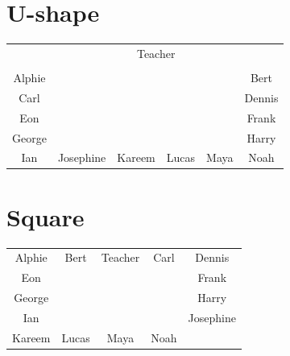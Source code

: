 \documentclass[landscape,a5paper]{article}
\begin{document}
\section{U-shape}
\begin{table}[ht]
\centering
\begin{tabular}{cccccc}
\cline{3-4} &  & \multicolumn{2}{|c|}{Teacher} &  & \\\cline{3-4}\\\cline{1-1} \cline{6-6}
\multicolumn{1}{|c|}{Alphie} &  &  &  &  & \multicolumn{1}{|c|}{Bert}\\\cline{1-1} \cline{6-6}\cline{1-1} \cline{6-6}
\multicolumn{1}{|c|}{Carl} &  &  &  &  & \multicolumn{1}{|c|}{Dennis}\\\cline{1-1} \cline{6-6}\cline{1-1} \cline{6-6}
\multicolumn{1}{|c|}{Eon} &  &  &  &  & \multicolumn{1}{|c|}{Frank}\\\cline{1-1} \cline{6-6}\cline{1-1} \cline{6-6}
\multicolumn{1}{|c|}{George} &  &  &  &  & \multicolumn{1}{|c|}{Harry}\\\cline{1-1} \cline{6-6}\cline{1-6}
\multicolumn{1}{|c|}{Ian} & \multicolumn{1}{|c|}{Josephine} & \multicolumn{1}{|c|}{Kareem} & \multicolumn{1}{|c|}{Lucas} & \multicolumn{1}{|c|}{Maya} & \multicolumn{1}{|c|}{Noah}\\\cline{1-6}
\end{tabular}
\end{table}

\clearpage
\section{Square}
\begin{table}[ht]
\centering
\begin{tabular}{ccccc}
\cline{1-5}
\multicolumn{1}{|c|}{Alphie} & \multicolumn{1}{|c|}{Bert} & \multicolumn{1}{|c|}{\cellcolor{gray} {\color{white}Teacher}} & \multicolumn{1}{|c|}{Carl} & \multicolumn{1}{|c|}{Dennis}\\\cline{1-5}\cline{1-1} \cline{5-5}
\multicolumn{1}{|c|}{Eon} &  &  &  & \multicolumn{1}{|c|}{Frank}\\\cline{1-1} \cline{5-5}\cline{1-1} \cline{5-5}
\multicolumn{1}{|c|}{George} &  &  &  & \multicolumn{1}{|c|}{Harry}\\\cline{1-1} \cline{5-5}\cline{1-1} \cline{5-5}
\multicolumn{1}{|c|}{Ian} &  &  &  & \multicolumn{1}{|c|}{Josephine}\\\cline{1-1} \cline{5-5}\cline{1-5}
\multicolumn{1}{|c|}{Kareem} & \multicolumn{1}{|c|}{Lucas} & \multicolumn{1}{|c|}{Maya} & \multicolumn{1}{|c|}{Noah} & \multicolumn{1}{|c|}{}\\\cline{1-5}
\end{tabular}
\end{table}
\end{document}
